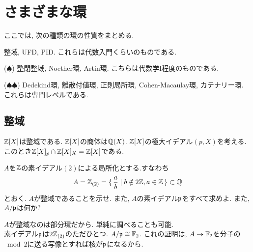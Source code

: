 \section{さまざまな環}
ここでは, 次の種類の環の性質をまとめる.
\ben
\item 整域, UFD, PID. これらは代数入門くらいのものである.
\item ($\spadesuit$) 整閉整域, Noether環,  Artin環. こちらは代数学I程度のものである.
\item ($\spadesuit\spadesuit$) Dedekind環, 離散付値環, 正則局所環, Cohen-Macaulay環, カテナリー環. これらは専門レベルである.
\een

\subsection{整域}


\begin{eg}
$\mathbb{Z}[X]$は整域である. $\mathbb{Z}[X]$の商体は$\mathbb{Q}(X)$.  $\mathbb{Z}[X]$の極大イデアル$(p,X)$を考える. このとき$\mathbb{Z}[X]_{p}\cap \mathbb{Z}[X]_{X} = \mathbb{Z}[X]$である.
\end{eg}


\begin{egprob}
$A$を$\mathbb{Z}$の素イデアル$(2)$による局所化とする.すなわち
\[A = \mathbb{Z}_{(2)} = \set{\dfrac{a}{b} \mid b\notin 2\mathbb{Z}, a\in \mathbb{Z}} \subset \mathbb{Q}\]
とおく. $A$が整域であることを示せ. また, $A$の素イデアル$\mathfrak{p}$をすべて求めよ. また, $A/\mathfrak{p}$は何か?
\end{egprob}
\begin{egans}
$A$が整域なのは部分環だから. 単純に調べることも可能. \\
素イデアル$\mathfrak{p}$は$2\mathbb{Z}_{(2)}$のただひとつ. $A/\mathfrak{p} \cong \mathbb{F}_{2}$. これの証明は, $A\to \mathbb{F}_{2}$を分子の$\bmod{2}$に送る写像とすれば核が$\mathfrak{p}$になるから.
\end{egans}



